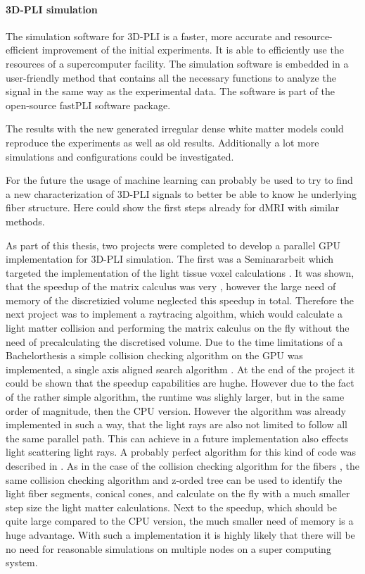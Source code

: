 \paragraph{\acs{3D-PLI} simulation} %
The simulation software for \ac{3D-PLI} is a faster, more accurate and resource-efficient improvement of the initial experiments.
It is able to efficiently use the resources of a supercomputer facility.
The simulation software is embedded in a user-friendly \python{} method that contains all the necessary functions to analyze the signal in the same way as the experimental data.
The software is part of the open-source \ac{fastPLI} software package.
\par
% 
The results with the new generated irregular dense white matter models could reproduce the experiments as well as old results.
Additionally a lot more simulations and configurations could be investigated.
\par
% 
For the future the usage of machine learning can probably be used to try to find a new characterization of \ac{3D-PLI} signals to better be able to know he underlying fiber structure.
Here \cite{ginsburgerDis2019} could show the first steps already for \ac{dMRI} with similar methods. 
\par
% 
As part of this thesis, two projects were completed to develop a parallel \ac{GPU} implementation for \ac{3D-PLI} simulation.
The first was a Seminararbeit \cite{Kobusch:Seminar} which targeted the implementation of the light tissue voxel calculations \dummy{}.
It was shown, that the speedup of the matrix calculus was very \dummy{}, however the large need of memory of the discretizied volume neglected this speedup in total.
Therefore the next project \cite{Kobusch:887783} was to implement a raytracing algoithm, which would calculate a light matter collision and performing the matrix calculus on the fly without the need of precalculating the discretised volume.
Due to the time limitations of a Bachelorthesis a simple collision checking algorithm on the \ac{GPU} was implemented, a single axis aligned search algorithm \cite{Karras2012}.
At the end of the project it could be shown that the speedup capabilities are hughe.
However due to the fact of the rather simple algorithm, the runtime was slighly larger, but in the same order of magnitude, then the \ac{CPU} version.
However the algorithm was already implemented in such a way, that the light rays are also not limited to follow all the same parallel path.
This can achieve in a future implementation also effects light scattering light rays.
A probably perfect algorithm for this kind of code was described in \cite{Karras2012}.
As in the case of the collision checking algorithm for the fibers \dummy{}, the same collision checking algorithm and z-orded tree can be used to identify the light fiber segments, \ie{} conical cones, and calculate on the fly with a much smaller step size the light matter calculations.
Next to the speedup, which should be quite large compared to the \ac{CPU} version, the much smaller need of memory is a huge advantage.
With such a implementation it is highly likely that there will be no need for reasonable simulations on multiple nodes on a super computing system.
% 
% 
% 

